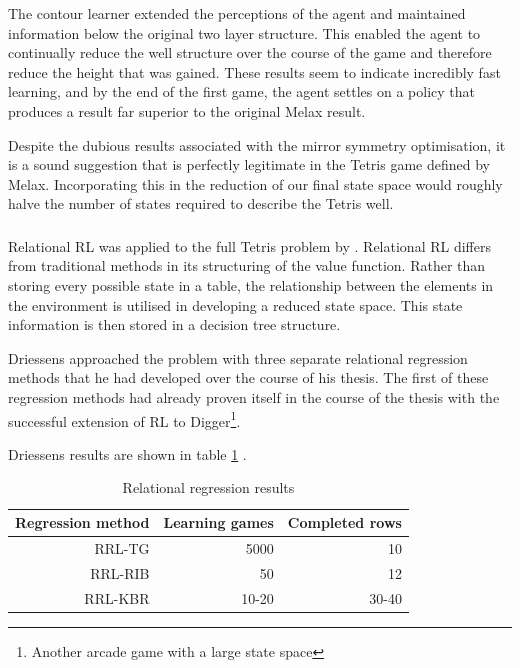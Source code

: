 \documentclass{rucsthesis}
\begin{document}
The contour learner extended the perceptions of the agent and maintained information below the original two layer structure. This enabled the agent to continually reduce the well structure over the course of the game and therefore reduce the height that was gained. These results seem to indicate incredibly fast learning, and by the end of the first game, the agent settles on a policy that produces a result far superior to the original Melax result.

Despite the dubious results associated with the mirror symmetry optimisation, it is a sound suggestion that is perfectly legitimate in the Tetris game defined by Melax. Incorporating this in the reduction of our final state space would roughly halve the number of states required to describe the Tetris well.

\subsubsection{\cite{kurt}}

Relational RL was applied to the full Tetris problem by \cite{kurt}. Relational RL differs from traditional methods in its structuring of the value function. Rather than storing every possible state in a table, the relationship between the elements in the environment is utilised in developing a reduced state space. This state information is then stored in a decision tree structure. 

Driessens approached the problem with three separate relational regression methods \citep{kurt} that he had developed over the course of his thesis. The first of these regression methods had already proven itself in the course of the thesis with the successful extension of RL to Digger\footnote{Another arcade game with a large state space}. 

Driessens results are shown in table \ref{tbl:driessens} .

\begin{table}[h]
\centering
\begin{tabular}{|r|r|r|}
\hline
Regression method & Learning games & Completed rows  \\
\hline
RRL-TG	&	5000	& 	10   \\
\hline
RRL-RIB  &  50  & 12  \\
\hline
RRL-KBR  &  10-20  & 30-40  \\
\hline
\end{tabular}
\caption{Relational regression results \citep{kurt}}
\label{tbl:driessens}
\end{table}
\end{document}
